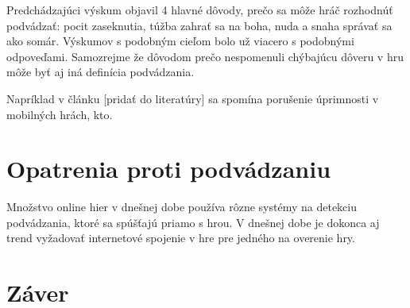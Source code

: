 \documentclass[10pt,twoside,slovak,a4paper]{article}
\begin{document}
Predchádzajúci výskum objavil 4 hlavné dôvody, prečo sa môže hráč rozhodnúť podvádzať: pocit zaseknutia, túžba zahrať sa na boha, nuda a snaha správať sa ako somár.\cite{mood} Výskumov s podobným cieľom bolo už viacero s podobnými odpoveďami. Samozrejme že dôvodom prečo nespomenuli chýbajúcu dôveru v hru môže byť aj iná definícia podvádzania.

Napríklad v článku [pridať do literatúry] sa spomína porušenie úprimnosti v mobilných hrách, kto. 






\section{Opatrenia proti podvádzaniu}

Množstvo online hier v dnešnej dobe používa rôzne systémy na detekciu podvádzania, ktoré sa spúšťajú priamo s hrou. V dnešnej dobe je dokonca aj trend vyžadovať internetové spojenie v hre pre jedného na overenie hry.

\section{Záver} \label{zaver} %






\end{document}
